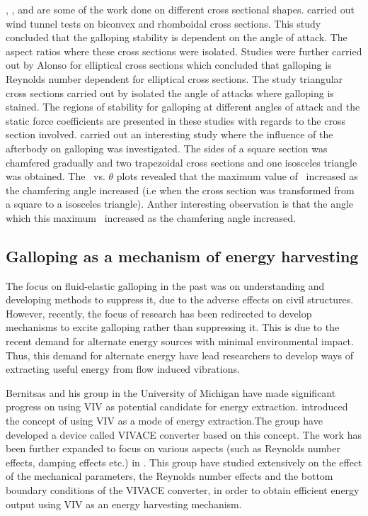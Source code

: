  
\citet{Naudascher1993}, \citet{Ruscheweyh1996}, \citet{Deniz1997} and \citet{Weaver2005} are some of the work done on different cross sectional shapes. \citet{Alonso2009} carried out wind tunnel tests on biconvex and rhomboidal cross sections. This study concluded that the galloping stability is dependent on the angle of attack. The aspect ratios where these cross sections were isolated. Studies were further carried out by Alonso for elliptical cross sections \citep{Alonso2010} which concluded that galloping is Reynolds number dependent for elliptical cross sections. The study triangular cross sections carried out by \citep{Alonso2005} isolated the angle of attacks where galloping is stained. The regions of stability for galloping at different angles of attack and the static force coefficients are presented in these studies with regards to the cross section involved. \citep{Luo1994} carried out an interesting study where the influence of the afterbody on galloping was investigated. The sides of a square section was chamfered gradually and two trapezoidal cross sections and one isosceles triangle was obtained. The \cy\ vs. $\theta$ plots revealed that the maximum value of \cy\ increased as the chamfering angle increased (i.e when the cross section was transformed from a square to a isosceles triangle). Anther interesting observation is that the angle which this maximum \cy\ increased as the chamfering angle increased.       


\subsection{Galloping as a mechanism of energy harvesting}

The focus on fluid-elastic galloping in the past was on understanding and developing methods to suppress it, due to the adverse effects on civil structures. However, recently, the focus of research has been redirected to develop mechanisms to excite galloping rather than suppressing it. This is due to the recent demand for alternate energy sources with minimal environmental impact. Thus, this demand for alternate energy have lead researchers to develop ways of extracting useful energy from flow induced vibrations.

Bernitsas and his group in the University of Michigan have made significant progress on using VIV as potential candidate for energy extraction. \cite{Bernitsas2008a-concept} introduced the concept of using VIV as a mode of energy extraction.The group have developed a device called VIVACE converter based on this concept. The work has been further expanded to focus on various aspects (such as Reynolds number effects, damping effects etc.) in \citet{Bernitsas2009,Raghavan2009,Raghavan2010a,Lee2011a}. This group have studied extensively on the effect of the mechanical parameters, the Reynolds number effects and the bottom boundary conditions of the VIVACE converter, in order to obtain efficient energy output using VIV as an energy harvesting mechanism. 


